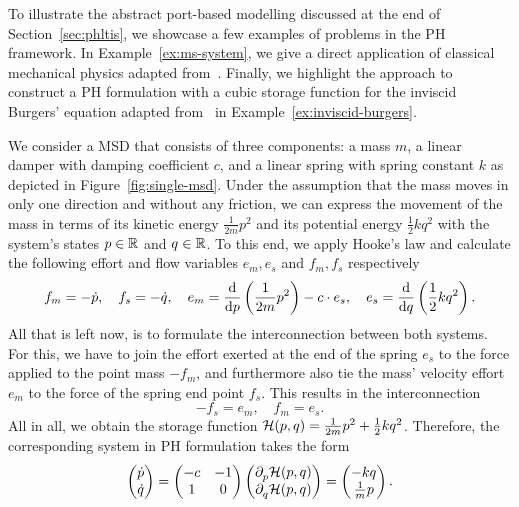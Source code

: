 To illustrate the abstract port-based modelling discussed at the end of Section~\ref{sec:phltis}, we showcase a few examples of problems in the \ac{PH} framework.
In Example~\ref{ex:ms-system}, we give a direct application of classical mechanical physics adapted from~\cite[Example~2.1]{VanDerSchaft2014}.
Finally, we highlight the approach to construct a \ac{PH} formulation with a cubic storage function for the inviscid Burgers' equation adapted from~\cite[Example~2.1]{Maschke2005} in Example~\ref{ex:inviscid-burgers}.

\begin{example}\label{ex:ms-system}
    We consider a \ac{MSD} that consists of three components: a mass $m$, a linear damper with damping coefficient $c$, and a linear spring with spring constant $k$ as depicted in Figure~\ref{fig:single-msd}.
    Under the assumption that the mass moves in only one direction and without any friction, we can express the movement of the mass in terms of its kinetic energy $\frac{1}{2m} p^2$ and its potential energy $\frac{1}{2} k q^2$ with the system's states $p \in \bb{R}$ and $q \in \bb{R}$.
    To this end, we apply Hooke's law and calculate the following effort and flow variables $e_m, e_s$ and $f_m, f_s$ respectively
    \begin{equation*}
        f_m = -\dot{p},\quad f_s = -\dot{q},\quad e_m = \frac{\dif}{\dif p} \left( \frac{1}{2m} p^2 \right) - c \cdot e_s,\quad e_s = \frac{\dif}{\dif q} \left( \frac{1}{2} k q^2 \right).
    \end{equation*}
    All that is left now, is to formulate the interconnection between both systems.
    For this, we have to join the effort exerted at the end of the spring $e_s$ to the force applied to the point mass $-f_m$, and furthermore also tie the mass' velocity effort $e_m$ to the force of the spring end point $f_s$.
    This results in the interconnection
    \begin{equation*}
        -f_s = e_m,\quad f_m = e_s.
    \end{equation*}
    All in all, we obtain the storage function $\mcl{H}(p, q) = \frac{1}{2m} p^2 + \frac{1}{2} k q^2$.
    Therefore, the corresponding system in \ac{PH} formulation takes the form
    \begin{equation*}
        \begin{pmatrix}
            \dot{p} \\
            \dot{q}
        \end{pmatrix} =
        \begin{pmatrix}
            -c & -1 \\
            1 & 0
        \end{pmatrix}
        \begin{pmatrix}
            \pd[p]{} \mcl{H}(p, q) \\
            \pd[q]{} \mcl{H}(p, q)
        \end{pmatrix} =
        \begin{pmatrix}
            -k q \\
            \frac{1}{m} p
        \end{pmatrix}.
    \end{equation*}


\end{example}
